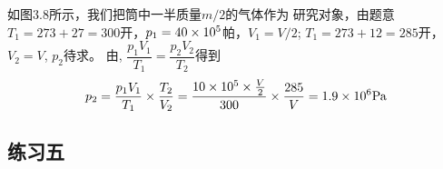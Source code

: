 \begin{enumerate}
\begin{figure}[htp]
    \centering
    \caption{}
\end{figure}

\begin{solution}
如图3.8所示，我们把筒中一半质量$m/2$的气体作为
    研究对象，由题意$T_1=273+27=300$开，$p_1=40\times10^5$帕，$V_1=V/2$; $T_1=273+12=285$开，$V_2=V$, $p_2$待求。
    由, $\dfrac{p_1V_1}{T_1}=\dfrac{p_2V_2}{T_2}$得到
\[p_2=\frac{p_1V_1}{T_1}\times \frac{T_2}{V_2}=\frac{10\times 10^5\times \frac{V}{2}}{300}\times \frac{285}{V}=1.9\times 10^6{\rm Pa}\]
\end{solution}
\end{enumerate}

\subsection{练习五}

